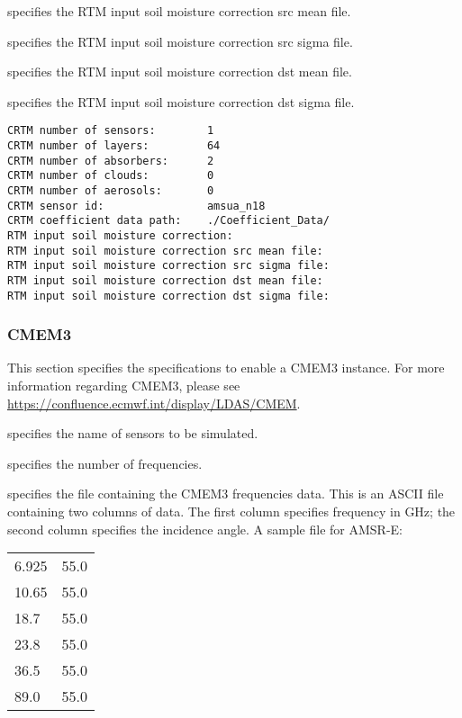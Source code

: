   specifies
 the RTM input soil moisture correction src mean file.

  specifies
 the RTM input soil moisture correction src sigma file.

  specifies
 the RTM input soil moisture correction dst mean file.

  specifies
 the RTM input soil moisture correction dst sigma file.
 

 \begin{Verbatim}[frame=single]
CRTM number of sensors:        1
CRTM number of layers:         64
CRTM number of absorbers:      2
CRTM number of clouds:         0 
CRTM number of aerosols:       0 
CRTM sensor id:                amsua_n18  
CRTM coefficient data path:    ./Coefficient_Data/
RTM input soil moisture correction:
RTM input soil moisture correction src mean file:
RTM input soil moisture correction src sigma file:
RTM input soil moisture correction dst mean file:
RTM input soil moisture correction dst sigma file:
 \end{Verbatim}

 
 \subsubsection{CMEM3} \label{ssec:cmem3}
 This section specifies the specifications to enable a CMEM3 instance.
 For more information regarding CMEM3, please see \\
 \hyperref{https://confluence.ecmwf.int/display/LDAS/CMEM}{}{}{https://confluence.ecmwf.int/display/LDAS/CMEM}.

  specifies the name of sensors to be simulated.

  specifies the number of
 frequencies.

  specifies the file
 containing the CMEM3 frequencies data.
 This is an ASCII file containing two columns of data.
 The first column specifies frequency in GHz; the second column
 specifies the incidence angle.  A sample file for AMSR-E:

 \begin{tabular}{lr}
  6.925 & 55.0 \\
  10.65 & 55.0 \\
  18.7  & 55.0 \\
  23.8  & 55.0 \\
  36.5  & 55.0 \\
  89.0  & 55.0 \\
 \end{tabular}

